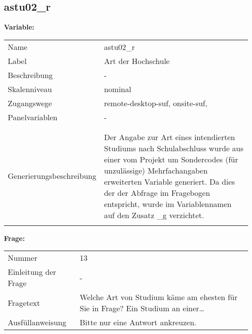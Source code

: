	
	
	\subsection{astu02\_r}
	\label{subSection:astu02_r}

	\noindent\textbf{Variable:}\\
		\begin{tabular}{lL{11.3cm}}
			\label{tableVariable:astu02_r}
			Name & astu02\_r \\
			Label & Art der Hochschule \\
			Beschreibung & - \\
			Skalenniveau & nominal \\
			Zugangswege &
				remote-desktop-suf,
				onsite-suf,
 \\
			Panelvariablen & -
			 \\
			 \\
 \\
					Generierungsbeschreibung & Der Angabe zur Art eines intendierten Studiums nach Schulabschluss wurde aus einer vom Projekt um Sondercodes (für unzulässige) Mehrfachangaben erweiterten Variable generiert. Da dies der der Abfrage im Fragebogen entspricht, wurde im Variablennamen auf den Zusatz \_g verzichtet.
				 \\	
			 \\
		\end{tabular}

		\vspace*{1 cm}
		\noindent\textbf{Frage:}\\
		\begin{tabular}{lL{11.3cm}}
			\label{tableQuestion:astu02_r}
			Nummer & 13 \\
			Einleitung der Frage & - \\
			Fragetext & Welche Art von Studium käme am ehesten für Sie in Frage? Ein Studium an einer… \\
			Ausfüllanweisung & Bitte nur eine Antwort ankreuzen. \\
		\end{tabular}





